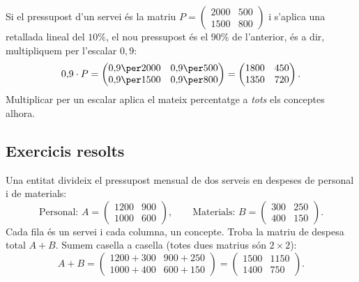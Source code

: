 \begin{exemple}
Si el pressupost d'un servei és la matriu $P=\begin{pmatrix} 2000 & 500 \\ 1500 & 800 \end{pmatrix}$
i s'aplica una retallada lineal del $10\%$, el nou pressupost és el $90\%$ de
l'anterior, és a dir, multipliquem per l'escalar $0{,}9$:
\[
0{,}9\cdot P=\begin{pmatrix} 0{,}9\per 2000 & 0{,}9\per 500 \\ 0{,}9\per 1500 & 0{,}9\per 800 \end{pmatrix}
            =\begin{pmatrix} 1800 & 450 \\ 1350 & 720 \end{pmatrix}.
\]
Multiplicar per un escalar aplica el mateix percentatge a \emph{tots} els conceptes alhora.
\end{exemple}

\subsection{Exercicis resolts}

\begin{exresolt}
Una entitat divideix el pressupost mensual de dos serveis en despeses de
personal i de materials:
\[
\text{Personal: } A=\begin{pmatrix} 1200 & 900 \\ 1000 & 600 \end{pmatrix},\qquad
\text{Materials: } B=\begin{pmatrix} 300 & 250 \\ 400 & 150 \end{pmatrix}.
\]
Cada fila és un servei i cada columna, un concepte. Troba la matriu de despesa
total $A+B$.
\solucio
Sumem casella a casella (totes dues matrius són $2\times 2$):
\[
A+B=\begin{pmatrix} 1200+300 & 900+250 \\ 1000+400 & 600+150 \end{pmatrix}
    =\begin{pmatrix} 1500 & 1150 \\ 1400 & 750 \end{pmatrix}.
\]
\end{exresolt}

